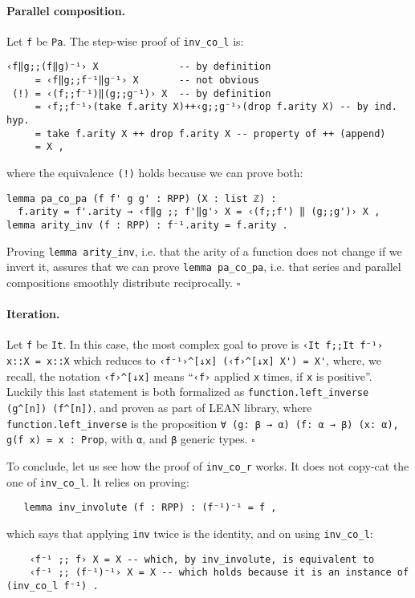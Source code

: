 \documentclass[runningheads]{llncs}
\newcommand*{\qedb}{\hfill\ensuremath{\square}}%
\newcommand{\LEAN}{\textsf{LEAN}\xspace}
\begin{document}
\paragraph{Parallel composition.} Let \lstinline|f| be \lstinline|Pa|. The step-wise proof of \lstinline|inv_co_l| is:
\begin{lstlisting}
‹f‖g;;(f‖g)⁻¹› X              -- by definition
     = ‹f‖g;;f⁻¹‖g⁻¹› X       -- not obvious
 (!) = ‹(f;;f⁻¹)‖(g;;g⁻¹)› X  -- by definition
     = ‹f;;f⁻¹›(take f.arity X)++‹g;;g⁻¹›(drop f.arity X) -- by ind. hyp.
     = take f.arity X ++ drop f.arity X -- property of ++ (append)
     = X ,
\end{lstlisting}
where the equivalence \lstinline|(!)| holds because we can prove both:
\begin{lstlisting}
lemma pa_co_pa (f f' g g' : RPP) (X : list ℤ) :
  f.arity = f'.arity → ‹f‖g ;; f'‖g'› X = ‹(f;;f') ‖ (g;;g')› X ,
lemma arity_inv (f : RPP) : f⁻¹.arity = f.arity .
\end{lstlisting}
Proving \lstinline|lemma arity_inv|, i.e. that the arity of a function does not change if we invert it, assures that we can prove \lstinline|lemma pa_co_pa|, i.e. that series and parallel compositions smoothly distribute reciprocally.
\qedb

\paragraph{Iteration.} Let \lstinline|f| be \lstinline|It|.
In this case, the most complex goal to prove is \lstinline|‹It f;;It f⁻¹› x::X = x::X| which reduces to \lstinline|‹f⁻¹›^[↓x] (‹f›^[↓x] X') = X'|, where, we recall, the notation \lstinline{‹f›^[↓x]} means ``\lstinline{‹f›} applied \lstinline{x} times, if \lstinline|x| is positive''. Luckily this last statement is both formalized as \lstinline|function.left_inverse (g^[n]) (f^[n])|, and proven as part of \LEAN library, where \lstinline{function.left_inverse} is the proposition \lstinline|∀ (g: β → α) (f: α → β) (x: α), g(f x) = x : Prop|, with \lstinline|α|, and \lstinline|β| generic types.
\qedb

\vspace{\baselineskip}
To conclude, let us see how the proof of \lstinline|inv_co_r| works. It does not copy-cat the one of \lstinline|inv_co_l|. It relies on proving:
\begin{lstlisting}
   lemma inv_involute (f : RPP) : (f⁻¹)⁻¹ = f ,
\end{lstlisting}
\noindent
which says that applying \lstinline|inv| twice is the identity, and on using \lstinline|inv_co_l|:
\begin{lstlisting}
    ‹f⁻¹ ;; f› X = X -- which, by inv_involute, is equivalent to
    ‹f⁻¹ ;; (f⁻¹)⁻¹› X = X -- which holds because it is an instance of (inv_co_l f⁻¹) .
\end{lstlisting}
\end{document}
